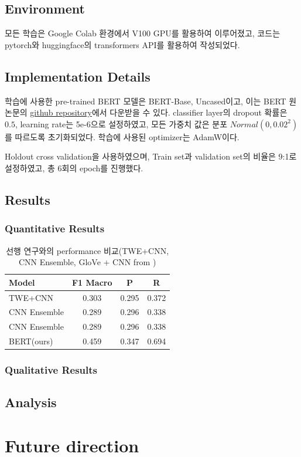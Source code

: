 \documentclass{article}
\begin{document}
\subsection{Environment}
모든 학습은 Google Colab 환경에서 V100 GPU를 활용하여 이루어졌고, 
코드는 pytorch와 huggingface의 transformers API를 활용하여 작성되었다.

\subsection{Implementation Details}
학습에 사용한 pre-trained BERT 모델은 BERT-Base, Uncased이고, 이는 BERT 원 논문의 \href{https://github.com/google-research/bert}{github repository}에서 다운받을 수 있다.
classifier layer의 dropout 확률은 $0.5$, learning rate는 5e-6으로 설정하였고, 모든 가중치 값은 분포 $Normal(0, 0.02^2)$를 따르도록 초기화되었다.
학습에 사용된 optimizer는 AdamW\cite{loshchilov2019decoupled}이다.

Holdout cross validation을 사용하였으며, Train set과 validation set의 비율은 9:1로 설정하였고, 총 6회의 epoch를 진행했다.

\subsection{Results}
\subsubsection{Quantitative Results}
\begin{table}[htb!]
    \begin{center}
        \begin{tabular}{lccc}\toprule
            Model & F1 Macro & P & R\\\midrule
            TWE+CNN & 0.303 & 0.295 & 0.372 \\
            CNN Ensemble & 0.289 & 0.296 & 0.338 \\
            CNN Ensemble & 0.289 & 0.296 & 0.338 \\\midrule
            BERT(ours) & 0.459 & 0.347 & 0.694\\\bottomrule
        \end{tabular}
        \caption{선행 연구와의 performance 비교(TWE+CNN, CNN Ensemble, GloVe + CNN from \cite{athavale2019})}
        \label{perf}
    \end{center}
\end{table}

\subsubsection{Qualitative Results}

\subsection{Analysis}


\section{Future direction}

\newpage


\end{document}
